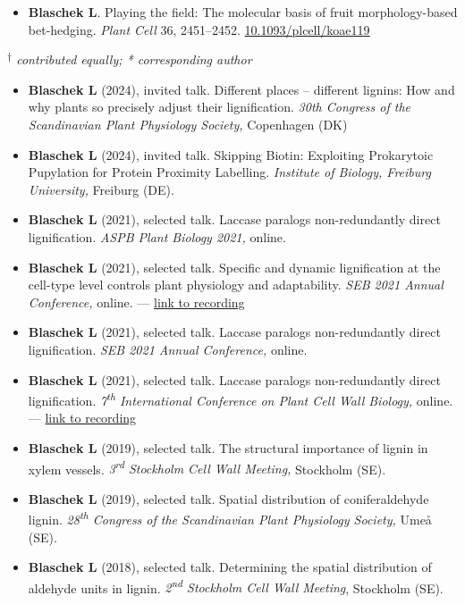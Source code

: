 \documentclass[11pt]{article}
\begin{document}
\vspace{-0.175cm}	
\begin{itemize}[label={},itemindent=-9pt,leftmargin=24pt]
	\itemsep-0.1cm
	\item \textbf{Blaschek L}. Playing the field: The molecular basis of fruit morphology-based bet-hedging. \textit{Plant Cell} 36, 2451--2452. \href{https://doi.org/10.1093/plcell/koae119}{10.1093/plcell/koae119}
\end{itemize}

\textit{\textsuperscript{$\dagger$} contributed equally; * corresponding author}
\vspace{0.5cm}

\newpage

\vspace{-0.175cm}
\begin{itemize}[label={},itemindent=-9pt,leftmargin=24pt]
	\itemsep-0.1cm
	\item \textbf{Blaschek L} (2024), invited talk. Different places – different lignins:
	How and why plants so precisely adjust their lignification. \textit{30th Congress of the Scandinavian Plant Physiology Society,} Copenhagen (DK)
	\item \textbf{Blaschek L} (2024), invited talk. Skipping Biotin: Exploiting Prokarytoic Pupylation for Protein Proximity Labelling. \textit{Institute of Biology, Freiburg University,} Freiburg (DE).
	\item \textbf{Blaschek L} (2021), selected talk. Laccase paralogs non-redundantly direct lignification. \textit{ASPB Plant Biology 2021,} online.
	\item \textbf{Blaschek L} (2021), selected talk. Specific and dynamic lignification at the cell-type level controls plant physiology and adaptability. \textit{SEB 2021 Annual Conference,} online. --- \href{https://leonardblaschek.github.io/talks.html}{link to recording}
	\item \textbf{Blaschek L} (2021), selected talk. Laccase paralogs non-redundantly direct lignification. \textit{SEB 2021 Annual Conference,} online.
	\item \textbf{Blaschek L} (2021), selected talk. Laccase paralogs non-redundantly direct lignification. \textit{7\textsuperscript{th} International Conference on Plant Cell Wall Biology,} online. --- \href{https://leonardblaschek.github.io/talks.html}{link to recording}
	\item \textbf{Blaschek L} (2019), selected talk. The structural importance of lignin in xylem vessels. \textit{3\textsuperscript{rd} Stockholm Cell Wall Meeting,} Stockholm (SE).
	\item \textbf{Blaschek L} (2019), selected talk. Spatial distribution of coniferaldehyde lignin. \textit{28\textsuperscript{th} Congress of the Scandinavian Plant Physiology Society,} Umeå (SE).
	\item \textbf{Blaschek L} (2018), selected talk. Determining the spatial distribution of aldehyde units in lignin. \textit{2\textsuperscript{nd} Stockholm Cell Wall Meeting}, Stockholm (SE).
\end{itemize}
\vspace{0.3cm}
\end{document}

